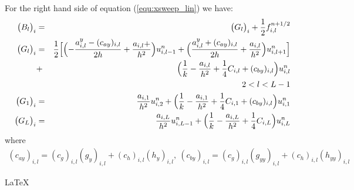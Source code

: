 \documentclass[12pt]{article}
\begin{document}
For the right hand side of equation (\ref{equ:xsweep_lin}) we have:
\begin{eqnarray}
\bigl(B_{l} \bigr)_i &=& \bigl(G_{l} \bigr)_i + \frac{1}{2}f^{n+1/2}_{i,l}\\
\bigl(G_{l} \bigr)_i &=&
\frac{1}{2}\Bigl[
\Bigl(-\frac{a^y_{i,l} -(c_{ay})_{i,l}}{2h} + \frac{a_{i,l} + }{h^2}\Bigr)
u^n_{i,l-1} +
\Bigl(\frac{a^y_{i,l} + (c_{ay})_{i,l}}{2h} + \frac{a_{i,l}}{h^2} \Bigr)
u^n_{i,l+1}
\Bigr]\\
 &+& \Bigl(\frac{1}{k} - \frac{ a_{i,l}}{h^2} + \frac{1}{4}C_{i,l} +
 (c_{by})_{i,l} \Bigr) u^n_{i,l} \nonumber \\
 & &2 < l < L-1 \nonumber \\
\bigl(G_{1} \bigr)_i &=& \frac{a_{i,1}}{h^2} u^n_{i,2} + 
\Bigl(\frac{1}{k} - \frac{ a_{i,1}}{h^2} + \frac{1}{4}C_{i,1} + (c_{by})_{i,l}
\Bigr) u^n_{i,1} \\
%
\bigl(G_{L} \bigr)_i &=&
\frac{a_{i,L}}{h^2} u^n_{i,L-1} + 
\Bigl(\frac{1}{k} - \frac{ a_{i,L}}{h^2} + \frac{1}{4}C_{i,L}\Bigr) u^n_{i,L}
\end{eqnarray}
where
\begin{eqnarray}
 (c_{ay})_{i,l} = (c_g)_{i,l} (g_y)_{i,l} + (c_h)_{i,l} (h_y)_{i,l}, \: 
 (c_{by})_{i,l} = (c_g)_{i,l} (g_{yy})_{i,l} + (c_h)_{i,l} (h_{yy})_{i,l} 
\end{eqnarray}



{\LaTeX}
\end{document}
